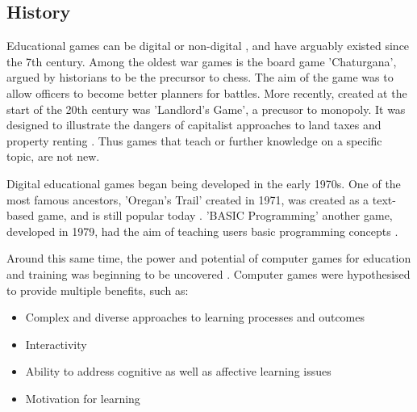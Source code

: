 \documentclass[a4paper,11.5pt]{report}
\numberwithin{figure}{section}
\numberwithin{table}{section}
\numberwithin{equation}{section}
\numberwithin{equation}{section}
\begin{document}

\subsection{History}

Educational games can be digital or non-digital \citep{Jean}, and have arguably existed since the 7th century. Among the oldest war games is the board game 'Chaturgana', argued by historians to be the precursor to chess. The aim of the game was to allow officers to become better planners for battles. More recently, created at the start of the 20th century was 'Landlord's Game', a precusor to monopoly. It was designed to illustrate the dangers of capitalist approaches to land taxes and property renting \citep{Wilkinson2016}. Thus games that teach or further knowledge on a specific topic, are not new.

Digital educational games began being developed in the early 1970s. One of the most famous ancestors, 'Oregan's Trail' created in 1971, was created as a text-based game, and is still popular today \citep{Jean}. 'BASIC Programming' another game, developed in 1979, had the aim of teaching users basic programming concepts \citep{Warren}.


Around this same time, the power and potential of computer games for education and training was beginning to be uncovered \citep{neil2005}. Computer games were hypothesised to provide multiple benefits, such as: 

\begin{itemize}
\item Complex and diverse approaches to learning processes and outcomes
\item Interactivity
\item Ability to address cognitive as well as affective learning issues
\item Motivation for learning
\end{itemize}

\end{document}
